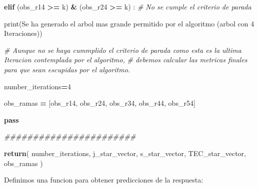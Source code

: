 \documentclass[
  11pt,
  a4paper,
]{article}
\newenvironment{Shaded}{\begin{snugshade}}{\end{snugshade}}
\newcommand{\BuiltInTok}[1]{#1}
\newcommand{\CommentTok}[1]{\textcolor[rgb]{0.56,0.35,0.01}{\textit{#1}}}
\newcommand{\ControlFlowTok}[1]{\textcolor[rgb]{0.13,0.29,0.53}{\textbf{#1}}}
\newcommand{\DecValTok}[1]{\textcolor[rgb]{0.00,0.00,0.81}{#1}}
\newcommand{\NormalTok}[1]{#1}
\newcommand{\OperatorTok}[1]{\textcolor[rgb]{0.81,0.36,0.00}{\textbf{#1}}}
\newcommand{\StringTok}[1]{\textcolor[rgb]{0.31,0.60,0.02}{#1}}
\begin{document}
\begin{Shaded}
\begin{Highlighting}[]
        \ControlFlowTok{elif}\NormalTok{ (obs\_r14 }\OperatorTok{\textgreater{}=}\NormalTok{ k) }\OperatorTok{\&}\NormalTok{ (obs\_r24 }\OperatorTok{\textgreater{}=}\NormalTok{ k) : }\CommentTok{\# No se cumple el criterio de parada}

            \BuiltInTok{print}\NormalTok{(}\StringTok{\textquotesingle{}Se ha generado el arbol mas grande permitido por el algoritmo (arbol con 4 Iteraciones)\textquotesingle{}}\NormalTok{)}

        \CommentTok{\# Aunque no se haya cummplido el criterio de parada como esta es la ultima Iteracion contemplada por el algoritmo, }
        \CommentTok{\# debemos calcular las metricas finales para que sean escupidas por el algoritmo. }
            
\NormalTok{            number\_iterations}\OperatorTok{=}\DecValTok{4}
            
\NormalTok{            obs\_ramas }\OperatorTok{=}\NormalTok{ [obs\_r14, obs\_r24, obs\_r34, obs\_r44, obs\_r54]}

            
              
            \ControlFlowTok{pass}

    \CommentTok{\#\#\#\#\#\#\#\#\#\#\#\#\#\#\#\#\#\#\#\#\#\#\#}
        
    \ControlFlowTok{return}\NormalTok{( number\_iterations, j\_star\_vector, s\_star\_vector, TEC\_star\_vector, obs\_ramas ) }
\end{Highlighting}
\end{Shaded}

\newpage

Definimos una funcion para obtener predicciones de la respuesta:
\end{document}
